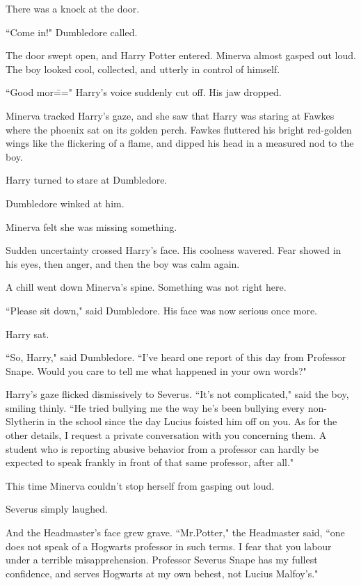 There was a knock at the door.

``Come in!" Dumbledore called.

The door swept open, and Harry Potter entered. Minerva almost gasped out loud. The boy looked cool, collected, and utterly in control of himself.

``Good mor\===" Harry's voice suddenly cut off. His jaw dropped.

Minerva tracked Harry's gaze, and she saw that Harry was staring at Fawkes where the phoenix sat on its golden perch. Fawkes fluttered his bright red-golden wings like the flickering of a flame, and dipped his head in a measured nod to the boy.

Harry turned to stare at Dumbledore.

Dumbledore winked at him.

Minerva felt she was missing something.

Sudden uncertainty crossed Harry's face. His coolness wavered. Fear showed in his eyes, then anger, and then the boy was calm again.

A chill went down Minerva's spine. Something was not right here.

``Please sit down," said Dumbledore. His face was now serious once more.

Harry sat.

``So, Harry," said Dumbledore. ``I've heard one report of this day from Professor Snape. Would you care to tell me what happened in your own words?"

Harry's gaze flicked dismissively to Severus. ``It's not complicated," said the boy, smiling thinly. ``He tried bullying me the way he's been bullying every non-Slytherin in the school since the day Lucius foisted him off on you. As for the other details, I request a private conversation with you concerning them. A student who is reporting abusive behavior from a professor can hardly be expected to speak frankly in front of that same professor, after all."

This time Minerva couldn't stop herself from gasping out loud.

Severus simply laughed.

And the Headmaster's face grew grave. ``Mr.\?Potter," the Headmaster said, ``one does not speak of a Hogwarts professor in such terms. I fear that you labour under a terrible misapprehension. Professor Severus Snape has my fullest confidence, and serves Hogwarts at my own behest, not Lucius Malfoy's."

